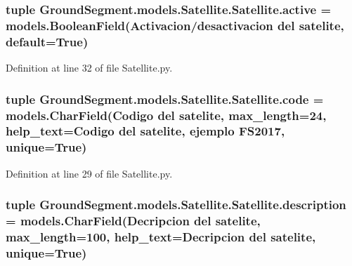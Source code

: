 \subsubsection[{active}]{\setlength{\rightskip}{0pt plus 5cm}tuple Ground\+Segment.\+models.\+Satellite.\+Satellite.\+active = models.\+Boolean\+Field(\textquotesingle{}Activacion/desactivacion del satelite\textquotesingle{}, default=True)\hspace{0.3cm}{\ttfamily [static]}}\label{class_ground_segment_1_1models_1_1_satellite_1_1_satellite_a43cd47392c46ca0c6c7c92a8828d7d26}


Definition at line 32 of file Satellite.\+py.

\hypertarget{class_ground_segment_1_1models_1_1_satellite_1_1_satellite_ae4a43a1ee941bff4914f4fed1e2775a1}{}
\subsubsection[{code}]{\setlength{\rightskip}{0pt plus 5cm}tuple Ground\+Segment.\+models.\+Satellite.\+Satellite.\+code = models.\+Char\+Field(\textquotesingle{}Codigo del satelite\textquotesingle{}, max\+\_\+length=24, help\+\_\+text=\textquotesingle{}Codigo del satelite, ejemplo F\+S2017\textquotesingle{}, unique=True)\hspace{0.3cm}{\ttfamily [static]}}\label{class_ground_segment_1_1models_1_1_satellite_1_1_satellite_ae4a43a1ee941bff4914f4fed1e2775a1}


Definition at line 29 of file Satellite.\+py.

\hypertarget{class_ground_segment_1_1models_1_1_satellite_1_1_satellite_a076215a5d0896cf97edbf312c7605000}{}
\subsubsection[{description}]{\setlength{\rightskip}{0pt plus 5cm}tuple Ground\+Segment.\+models.\+Satellite.\+Satellite.\+description = models.\+Char\+Field(\textquotesingle{}Decripcion del satelite\textquotesingle{}, max\+\_\+length=100, help\+\_\+text=\textquotesingle{}Decripcion del satelite\textquotesingle{}, unique=True)\hspace{0.3cm}{\ttfamily [static]}}\label{class_ground_segment_1_1models_1_1_satellite_1_1_satellite_a076215a5d0896cf97edbf312c7605000}


